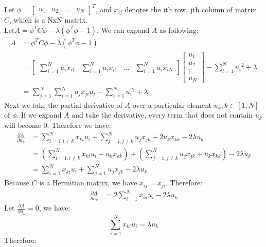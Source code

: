 \documentclass{article}
\begin{document}
\subsection{}
Let $\phi=\begin{bmatrix}u_1 & u_2 & \ldots & u_N\end{bmatrix}^T$, and $x_{ij}$ denotes the ith row, jth column of matrix $C$, which is a NxN matrix. \\
Let$A = \phi^T C \phi - \lambda(\phi^T \phi - 1)$. We can expand $A$ as following:
\begin{align*}
A &= \phi^T C \phi - \lambda(\phi^T \phi - 1) \\
&= \begin{bmatrix} \sum\limits_{i=1}^{N}{u_i x_{i1}} & \sum\limits_{i=1}^{N}{u_i x_{i1}} &\ldots &\sum\limits_{i=1}^{N}{u_i x_{iN}}\end{bmatrix}
\begin{bmatrix}u_1 \\ u_2 \\ \vdots \\ u_N\end{bmatrix} - \sum_{t=1}^{N}{u_i}^2 + \lambda \\
&= \sum_{j=1}^{N}\sum_{i=1}^{N}u_j x_{ji} u_i - \sum_{t=1}^{N}{u_i}^2 + \lambda
\end{align*}
Next we take the partial derivative of $A$ over a particular element $u_k, k\in[1,N]$ of $\phi$. If we expand $A$ and take the derivative, every term that does not contain $u_k$ will become $0$. Therefore we have:
\begin{align*}
\frac{\partial A}{\partial u_k} &= \sum_{i=1, i \ne k}^{N}{x_{ki} u_i} + \sum_{j=1, j \ne k}^{N}{u_j x_{jk}} + 2u_k x_{kk} - 2\lambda u_k \\
&=\left(\sum_{i=1, i \ne k}^{N}{x_{ki} u_i} +  u_k x_{kk}\right) + \left(\sum_{j=1, j \ne k}^{N}{u_j x_{jk}} + u_k x_{kk}\right) - 2\lambda u_k \\
&= \sum_{i=1}^{N}{x_{ki} u_i} + \sum_{j=1}^{N}{u_j x_{jk}} - 2\lambda u_k
\end{align*}
Because $C$ is a Hermitian matrix, we have $x_{ij} = x_{ji}$. Therefore:
\begin{align*}
\frac{\partial A}{\partial u_k} &= 2\sum_{i=1}^{N}{x_{ki}u_i} - 2\lambda u_k
\end{align*}
Let $\frac{\partial A}{\partial u_k} = 0$, we have:
\begin{equation*}
\sum_{i=1}^{N}{x_{ki}u_i} = \lambda u_k
\end{equation*}
Therefore:
\end{document}
